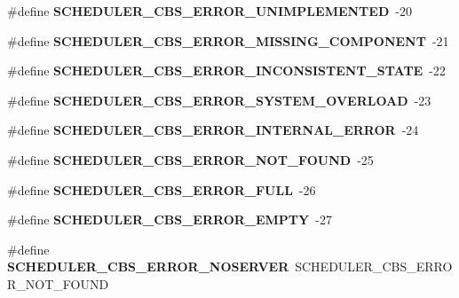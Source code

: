 \begin{DoxyCompactItemize}
\#define {\bfseries S\+C\+H\+E\+D\+U\+L\+E\+R\+\_\+\+C\+B\+S\+\_\+\+E\+R\+R\+O\+R\+\_\+\+U\+N\+I\+M\+P\+L\+E\+M\+E\+N\+T\+ED}~-\/20
\item 
\mbox{\label{group__RTEMSScoreSchedulerCBS_ga8aa5dd90215750605bdf6d906e8f183f}} 
\#define {\bfseries S\+C\+H\+E\+D\+U\+L\+E\+R\+\_\+\+C\+B\+S\+\_\+\+E\+R\+R\+O\+R\+\_\+\+M\+I\+S\+S\+I\+N\+G\+\_\+\+C\+O\+M\+P\+O\+N\+E\+NT}~-\/21
\item 
\mbox{\label{group__RTEMSScoreSchedulerCBS_ga74aa67736ea6de9de78396020cb23612}} 
\#define {\bfseries S\+C\+H\+E\+D\+U\+L\+E\+R\+\_\+\+C\+B\+S\+\_\+\+E\+R\+R\+O\+R\+\_\+\+I\+N\+C\+O\+N\+S\+I\+S\+T\+E\+N\+T\+\_\+\+S\+T\+A\+TE}~-\/22
\item 
\mbox{\label{group__RTEMSScoreSchedulerCBS_ga11ed7da699cb722f39f18e1232b3dee8}} 
\#define {\bfseries S\+C\+H\+E\+D\+U\+L\+E\+R\+\_\+\+C\+B\+S\+\_\+\+E\+R\+R\+O\+R\+\_\+\+S\+Y\+S\+T\+E\+M\+\_\+\+O\+V\+E\+R\+L\+O\+AD}~-\/23
\item 
\mbox{\label{group__RTEMSScoreSchedulerCBS_ga48378a6cd658ba40bec825863477a637}} 
\#define {\bfseries S\+C\+H\+E\+D\+U\+L\+E\+R\+\_\+\+C\+B\+S\+\_\+\+E\+R\+R\+O\+R\+\_\+\+I\+N\+T\+E\+R\+N\+A\+L\+\_\+\+E\+R\+R\+OR}~-\/24
\item 
\mbox{\label{group__RTEMSScoreSchedulerCBS_gae0ee8c5781c04c97bace0482eb953b34}} 
\#define {\bfseries S\+C\+H\+E\+D\+U\+L\+E\+R\+\_\+\+C\+B\+S\+\_\+\+E\+R\+R\+O\+R\+\_\+\+N\+O\+T\+\_\+\+F\+O\+U\+ND}~-\/25
\item 
\mbox{\label{group__RTEMSScoreSchedulerCBS_ga5096157327e8cf8a9b0561146c2aaadf}} 
\#define {\bfseries S\+C\+H\+E\+D\+U\+L\+E\+R\+\_\+\+C\+B\+S\+\_\+\+E\+R\+R\+O\+R\+\_\+\+F\+U\+LL}~-\/26
\item 
\mbox{\label{group__RTEMSScoreSchedulerCBS_gaad50801158e611bfd465543ebd43f9a1}} 
\#define {\bfseries S\+C\+H\+E\+D\+U\+L\+E\+R\+\_\+\+C\+B\+S\+\_\+\+E\+R\+R\+O\+R\+\_\+\+E\+M\+P\+TY}~-\/27
\item 
\mbox{\label{group__RTEMSScoreSchedulerCBS_ga104d3ab97fee7eadc937ea783000b93e}} 
\#define {\bfseries S\+C\+H\+E\+D\+U\+L\+E\+R\+\_\+\+C\+B\+S\+\_\+\+E\+R\+R\+O\+R\+\_\+\+N\+O\+S\+E\+R\+V\+ER}~S\+C\+H\+E\+D\+U\+L\+E\+R\+\_\+\+C\+B\+S\+\_\+\+E\+R\+R\+O\+R\+\_\+\+N\+O\+T\+\_\+\+F\+O\+U\+ND
\end{DoxyCompactItemize}

